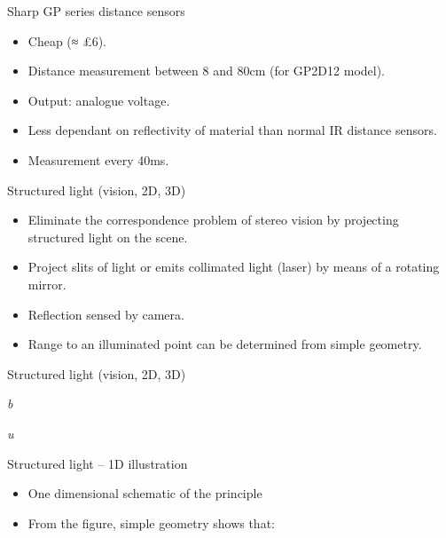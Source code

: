 \documentclass[compress]{beamer}
\begin{document}
\begin{frame}{Sharp GP series distance sensors}

\begin{itemize}

\item
  Cheap (≈ £6).
\item
  Distance measurement between 8 and 80cm (for GP2D12 model).
\item
  Output: analogue voltage.
\item
  Less dependant on reflectivity of material than normal IR distance
  sensors.
\item
  Measurement every 40ms.
\end{itemize}

\end{frame}

\begin{frame}{Structured light (vision, 2D, 3D)}

\begin{itemize}

\item
  Eliminate the correspondence problem of stereo vision by projecting
  structured light on the scene.
\item
  Project slits of light or emits collimated light (\eg laser) by means
  of a rotating mirror.
\item
  Reflection sensed by camera.
\item
  Range to an illuminated point can be determined from simple geometry.
\end{itemize}

\end{frame}

\begin{frame}{Structured light (vision, 2D, 3D)}

\emph{b}

\emph{u}

\end{frame}

\begin{frame}{Structured light -- 1D illustration}

\begin{itemize}

\item
  One dimensional schematic of the principle
\item
  From the figure, simple geometry shows that:
\end{itemize}

\end{frame}
\end{document}
